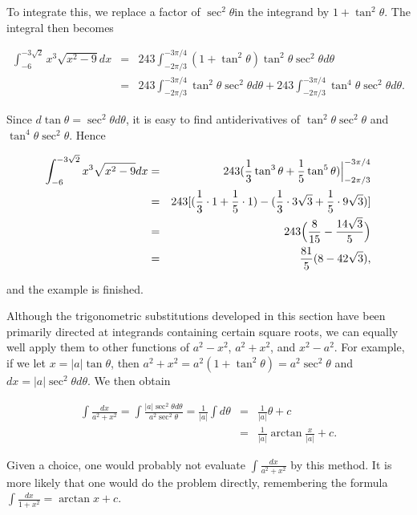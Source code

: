 \noindent To integrate this, we replace a factor of  $\sec^{2}\theta $in the integrand by $1 + \tan^{2} \theta$. The integral then becomes

\begin{eqnarray*} 
\int^{-3 \sqrt2}_{-6} x^{3} \sqrt{x^2 - 9} dx
&=& 243 \int^{-3\pi/4}_{-2\pi/3} (1 + \tan^{2}\theta) \tan^{2}\theta \sec^{2} \theta d\theta \\
&=& 243 \int^{-3\pi/4}_{-2\pi/3} \tan^{2}\theta \sec^{2}\theta d\theta 
+ 243 \int^{-3\pi/4}_{-2\pi/3} \tan^{4}\theta \sec^{2}\theta d\theta.
\end{eqnarray*}


\noindent Since $d \tan \theta = \sec^{2}\theta d\theta$, it is easy to find antiderivatives of $\tan^{2}\theta \sec^{2} \theta$ and $\tan^{4}\theta \sec^{2}\theta$. Hence

\begin{eqnarray*}
\int_{-6}^{-3\sqrt2} x^{3} \sqrt{x^2 - 9} dx &=& 243(\frac{1}{3} \tan^{3}\theta + \frac{1}{5} \tan^{5} \theta) \Big|^{-3\pi/4}_{-2\pi/3} \\
&=& 243 [(\frac{1}{3} \cdot 1 + \frac{1}{5} \cdot 1) - (\frac{1}{3} \cdot 3\sqrt3 + \frac{1}{5} \cdot 9\sqrt 3)]\\
&=& 243 \Bigl( \frac{8}{15} - \frac{14 \sqrt 3}{5} \Bigr) \\
&=& \frac{81}{5}(8 - 42\sqrt 3),
\end{eqnarray*}

\noindent and the example is finished.

Although the trigonometric substitutions developed in this section have been primarily directed at integrands containing certain square roots, we can equally well apply them to other functions of $a^2 - x^2$, $a^2 + x^2$, and $x^2 - a^2$. For example, if we let $x = |a| \tan \theta$, then $a^2 + x^2 = a^{2}(1 + \tan^{2}\theta) = a^{2} \sec^{2} \theta$ and $dx = |a| \sec^{2}\theta d\theta$. We then obtain


\begin{eqnarray*}
\int  \frac{dx}{a^2 + x^2} = \int \frac{ |a| \sec^{2}\theta d\theta}{a^{2} \sec^{2} \theta} 
= \frac{1}{|a|} \int d \theta &=& \frac{1}{|a|} \theta + c  \\
&=& \frac{1}{|a|} \arctan\frac{x}{ |a|} + c.
\end{eqnarray*}

\noindent Given a choice, one would probably not evaluate $\int \frac{dx}{a^2 + x^2}$ by this method. It is more likely that one would do the problem directly,  remembering the formula $\int \frac{dx}{1 + x^2} = \arctan x + c$.

